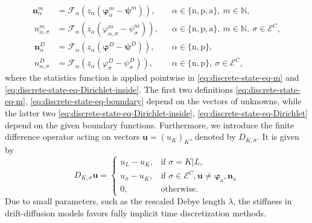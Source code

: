 \documentclass[10pt,a4paper, final]{article}
\def\electrons{\text{n}}
\def\holes{\text{p}}
\def\ions{\text{a}}
\theoremstyle{definition}								%
\numberwithin{equation}{section}
\numberwithin{figure}{section}
\numberwithin{theorem}{section}
\begin{document}
\begin{subequations}\label{eq:discrete-state-eq}
    \begin{align}
        {\boldsymbol n}_{\alpha}^m &= \mathcal{F}_\alpha \left(z_\alpha ({\boldsymbol \varphi}_{\alpha}^m - {\boldsymbol \psi}^m)\right), && \alpha \in \{ \electrons, \holes, \ions \},\ m\in\mathbb{N},\label{eq:discrete-state-eq-m}\\
        ~
        n_{\alpha, \sigma}^m & = \mathcal{F}_\alpha \left(z_\alpha (\varphi_{\alpha, \sigma}^m - \psi_\sigma^m)\right), && \alpha \in \{ \electrons, \holes, \ions  \}, \ m\in\mathbb{N}, \ \sigma \in \mathcal{E}^C, \label{eq:discrete-state-eq-boundary}\\
        ~
        {\boldsymbol n}_{\alpha}^D &= \mathcal{F}_\alpha \left(z_\alpha ({\boldsymbol \varphi}^D - {\boldsymbol \psi}^D)\right), && \alpha \in \{ \electrons, \holes \},\label{eq:discrete-state-eq-Dirichlet-inside}\\
        ~
        n_{\alpha, \sigma}^D &= \mathcal{F}_\alpha \left(z_\alpha (\varphi_{\sigma}^D - \psi^D_\sigma)\right), && \alpha \in \{ \electrons, \holes  \},\ \sigma \in \mathcal{E}^C,\label{eq:discrete-state-eq-Dirichlet}
    \end{align}
\end{subequations}
where the statistics function is applied pointwise in \eqref{eq:discrete-state-eq-m} and \eqref{eq:discrete-state-eq-Dirichlet-inside}.
The first two definitions \eqref{eq:discrete-state-eq-m}, \eqref{eq:discrete-state-eq-boundary} depend on the vectors of unknowns, while the latter two \eqref{eq:discrete-state-eq-Dirichlet-inside}, \eqref{eq:discrete-state-eq-Dirichlet} depend on the given boundary functions.
Furthermore, we introduce the finite difference operator acting on vectors ${\boldsymbol u} = (u_K)_K$, denoted by $D_{K,\sigma}$.
It is given by
\begin{equation}\label{eq:difference-operator}
    D_{K,\sigma}{\boldsymbol u} = \left\{
    \begin{array}{ll}
        u_L - u_K, &\text{if }\sigma = K|L,\\
        u_\sigma - u_K, &\text{if }\sigma\in\mathcal{E}^C, \boldsymbol{u} \neq \boldsymbol{\varphi}_\ions, \boldsymbol{n}_\ions \\
        0, &\text{otherwise.}
    \end{array}
    \right.
\end{equation}
Due to small parameters, such as the rescaled Debye length $\lambda$, the stiffness in drift-diffusion models favors fully implicit time discretization methods.
\end{document}
